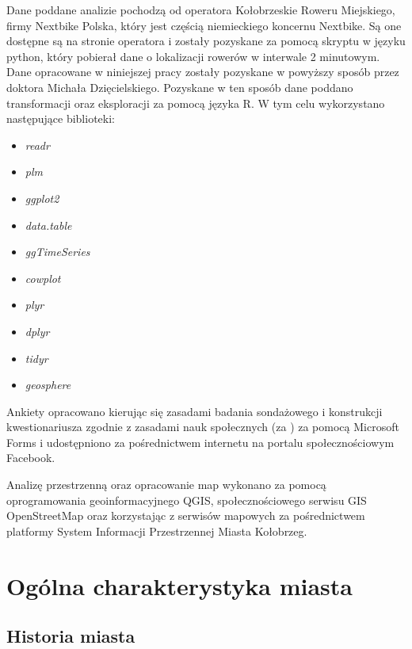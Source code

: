\documentclass{amuthesis}
\begin{document}
Dane poddane analizie pochodzą od operatora Kołobrzeskie Roweru Miejskiego, firmy Nextbike Polska, który jest częścią niemieckiego koncernu Nextbike.
Są one dostępne są na stronie operatora i zostały pozyskane za pomocą skryptu w języku python, który pobierał dane o lokalizacji rowerów w interwale 2 minutowym.
Dane opracowane w niniejszej pracy zostały pozyskane w powyższy sposób przez doktora Michała Dzięcielskiego.
Pozyskane w ten sposób dane poddano transformacji oraz eksploracji za pomocą języka R.
W tym celu wykorzystano następujące biblioteki:

\begin{itemize}
\item
  \emph{readr} \autocite{R-readr}
\item
  \emph{plm} \autocite{R-plm}
\item
  \emph{ggplot2} \autocite{R-ggplot2}
\item
  \emph{data.table} \autocite{R-data.table}
\item
  \emph{ggTimeSeries} \autocite{R-ggTimeSeries}
\item
  \emph{cowplot} \autocite{R-cowplot}
\item
  \emph{plyr} \autocite{R-plyr}
\item
  \emph{dplyr} \autocite{R-dplyr}
\item
  \emph{tidyr} \autocite{R-tidyr}
\item
  \emph{geosphere} \autocite{R-geosphere}
\end{itemize}

Ankiety opracowano kierując się zasadami badania sondażowego i konstrukcji kwestionariusza zgodnie z zasadami nauk społecznych (za \textcite{nachmias}) za pomocą Microsoft Forms i udostępniono za pośrednictwem internetu na portalu społecznościowym Facebook.

Analizę przestrzenną oraz opracowanie map wykonano za pomocą oprogramowania geoinformacyjnego QGIS, społecznościowego serwisu GIS OpenStreetMap oraz korzystając z serwisów mapowych za pośrednictwem platformy System Informacji Przestrzennej Miasta Kołobrzeg.

\hypertarget{ogolny}{%
\chapter{Ogólna charakterystyka miasta}\label{ogolny}}

\hypertarget{historia}{%
\section{Historia miasta}\label{historia}}
\end{document}
